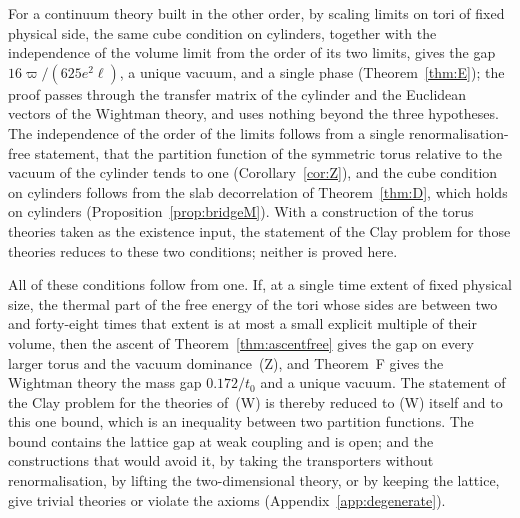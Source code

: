For a continuum theory built in the other order, by scaling limits on tori
of fixed physical side, the same cube condition on cylinders, together with
the independence of the volume limit from the order of its two limits, gives
the gap $16\varpi/(625e^2\ell)$, a unique vacuum, and a single phase
(Theorem~\ref{thm:E}); the proof passes through the transfer matrix of the
cylinder and the Euclidean vectors of the Wightman theory, and uses nothing
beyond the three hypotheses. The independence of the order of the limits
follows from a single renormalisation-free statement, that the partition
function of the symmetric torus relative to the vacuum of the cylinder tends
to one (Corollary~\ref{cor:Z}), and the cube condition on cylinders follows
from the slab decorrelation of Theorem~\ref{thm:D}, which holds on cylinders
(Proposition~\ref{prop:bridgeM}). With a construction of the torus theories
taken as the existence input, the statement of the Clay problem for those
theories reduces to these two conditions; neither is proved here.

All of these conditions follow from one. If, at a single time extent of
fixed physical size, the thermal part of the free energy of the tori whose
sides are between two and forty-eight times that extent is at most a small
explicit multiple of their volume, then the ascent of
Theorem~\ref{thm:ascentfree} gives the gap on every larger torus and the
vacuum dominance~(Z), and Theorem~F gives the Wightman theory the mass gap
$0.172/t_0$ and a unique vacuum. The statement of the Clay problem for the
theories of~(W) is thereby reduced to (W) itself and to this one bound,
which is an inequality between two partition functions. The bound contains
the lattice gap at weak coupling and is open; and the constructions that
would avoid it, by taking the transporters without renormalisation, by
lifting the two-dimensional theory, or by keeping the lattice, give trivial
theories or violate the axioms (Appendix~\ref{app:degenerate}).

